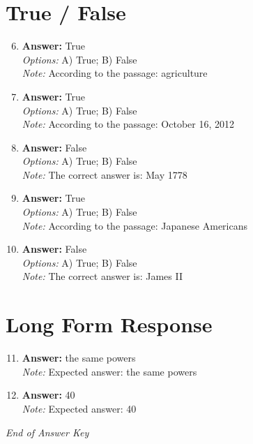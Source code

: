 \documentclass[12pt]{article}
\begin{document}
\section*{True / False}
\begin{enumerate}[label=\arabic*.]
\setcounter{enumi}{5}
\item \textbf{Answer:} True
\\ \textit{Options:} A) True; B) False
\\ \textit{Note:} According to the passage: agriculture
\item \textbf{Answer:} True
\\ \textit{Options:} A) True; B) False
\\ \textit{Note:} According to the passage: October 16, 2012
\item \textbf{Answer:} False
\\ \textit{Options:} A) True; B) False
\\ \textit{Note:} The correct answer is: May 1778
\item \textbf{Answer:} True
\\ \textit{Options:} A) True; B) False
\\ \textit{Note:} According to the passage: Japanese Americans
\item \textbf{Answer:} False
\\ \textit{Options:} A) True; B) False
\\ \textit{Note:} The correct answer is: James II
\end{enumerate}

\section*{Long Form Response}
\begin{enumerate}[label=\arabic*.]
\setcounter{enumi}{10}
\item \textbf{Answer:} the same powers
\\ \textit{Note:} Expected answer: the same powers
\item \textbf{Answer:} 40
\\ \textit{Note:} Expected answer: 40
\end{enumerate}

\vfill
\noindent\textit{End of Answer Key}
\end{document}
